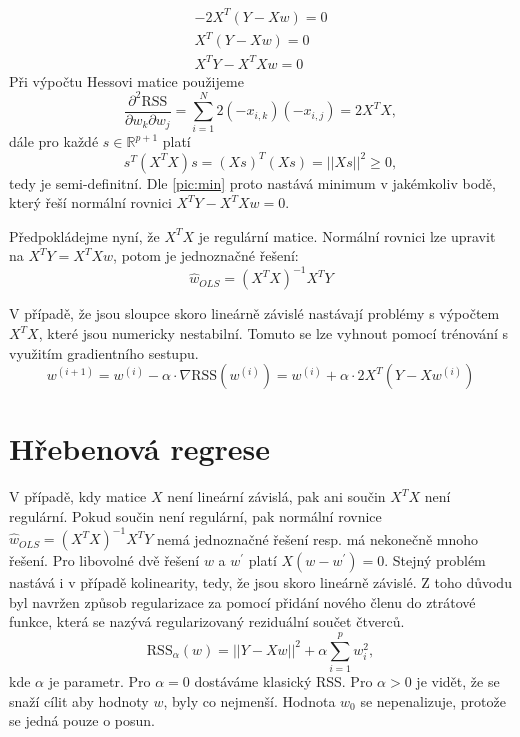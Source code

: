 \documentclass[12pt]{article}
\begin{document}
\begin{equation}
\begin{aligned}
-2X^T(Y-Xw)=0\\
X^T(Y-Xw)=0\\
X^TY-X^TXw=0
\end{aligned}
\end{equation}
Při výpočtu Hessovi matice použijeme
\begin{equation}
\frac{\partial^2\text{RSS}}{\partial w_k \partial w_j}=\sum_{i=1}^N2(-x_{i,k})(-x_{i,j})=2X^TX,
\end{equation}
dále pro každé $s\in \mathbb{R}^{p+1}$ platí
\begin{equation}
s^T(X^TX)s=(Xs)^T(Xs)=||Xs||^2\geq 0,
\end{equation}
tedy je semi-definitní. Dle \ref{pic:min} proto nastává minimum v jakémkoliv bodě, který řeší normální rovnici $X^TY-X^TXw=0$.

Předpokládejme nyní, že $X^TX$ je regulární matice. Normální rovnici lze upravit na $X^TY=X^TXw$, potom je jednoznačné řešení:
\begin{equation}
\hat{w}_{OLS}=(X^TX)^{-1}X^TY
\end{equation}


V případě, že jsou sloupce skoro lineárně závislé nastávají problémy s výpočtem $X^TX$, které jsou numericky nestabilní. Tomuto se lze vyhnout pomocí trénování s využitím gradientního sestupu.
\begin{equation}
w^{(i+1)}=w^{(i)}-\alpha\cdot \nabla\text{RSS}(w^{(i)})=w^{(i)}+\alpha \cdot 2X^T(Y-Xw^{(i)})
\end{equation}


\section{Hřebenová regrese}
V případě, kdy matice $X$ není lineární závislá, pak ani součin $X^TX$ není regulární. Pokud součin není regulární, pak normální rovnice $\hat{w}_{OLS}=(X^TX)^{-1}X^TY$ nemá jednoznačné řešení resp. má nekonečně mnoho řešení. Pro libovolné dvě řešení $w$ a $w^\prime$  platí $X(w-w^\prime)=0$. Stejný problém nastává i v případě kolinearity, tedy, že jsou skoro lineárně závislé. Z toho důvodu byl navržen způsob regularizace za pomocí přidání nového členu do ztrátové funkce, která se nazývá regularizovaný reziduální součet čtverců.
\begin{equation}
\text{RSS}_\alpha(w)=||Y-Xw||^2+\alpha \sum_{i=1}^pw_i^2,
\end{equation} 
kde $\alpha$ je parametr. Pro $\alpha=0$ dostáváme klasický RSS. Pro $\alpha>0$ je vidět, že se snaží cílit aby hodnoty $w$, byly co nejmenší. Hodnota $w_0$ se nepenalizuje, protože se jedná pouze o posun.
\end{document}
